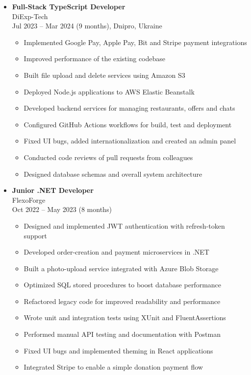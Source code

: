 \begin{itemize}[noitemsep]
    \item \textbf{Full-Stack TypeScript Developer} \\
    DiExp-Tech \\
        Jul 2023 -- Mar 2024 \; (9 months), \bskip Dnipro, \bskip Ukraine
    \begin{itemize}[noitemsep]
        \item Implemented Google Pay, Apple Pay, Bit and Stripe payment integrations
        \item Improved performance of the existing codebase
        \item Built file upload and delete services using Amazon S3
        \item Deployed Node.js applications to AWS Elastic Beanstalk
        \item Developed backend services for managing restaurants, offers and chats
        \item Configured GitHub Actions workflows for build, test and deployment
        \item Fixed UI bugs, added internationalization and created an admin panel
        \item Conducted code reviews of pull requests from colleagues
        \item Designed database schemas and overall system architecture
    \end{itemize}

    \item \textbf{Junior .NET Developer} \\
    FlexoForge \\
    Oct 2022 -- May 2023 \;(8 months)
    \begin{itemize}[noitemsep]
        \item Designed and implemented JWT authentication with refresh-token support
        \item Developed order-creation and payment microservices in .NET
        \item Built a photo-upload service integrated with Azure Blob Storage
        \item Optimized SQL stored procedures to boost database performance
        \item Refactored legacy code for improved readability and performance
        \item Wrote unit and integration tests using XUnit and FluentAssertions
        \item Performed manual API testing and documentation with Postman
        \item Fixed UI bugs and implemented theming in React applications
        \item Integrated Stripe to enable a simple donation payment flow
    \end{itemize}
\end{itemize}